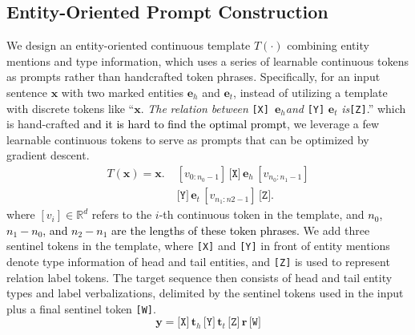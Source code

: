 \documentclass[11pt]{article}
\begin{document}
\subsection{Entity-Oriented Prompt Construction}\label{4.2}
We design an entity-oriented continuous template $T(\cdot)$ combining entity mentions and type information, which uses a series of learnable continuous tokens \cite{DBLP:journals/corr/abs-2103-10385} as prompts rather than handcrafted token phrases. Specifically, for an input sentence $\boldsymbol{x}$ with two marked entities $\boldsymbol{e}_h$ and $\boldsymbol{e}_t$, instead of utilizing a template with discrete tokens like ``$\boldsymbol{x}.$ \textit{The} \textit{relation} \textit{between} \texttt{[X]} \,$\boldsymbol{e}_h$\;\textit{and}\;  \texttt{[Y]}\; $\boldsymbol{e}_t$ \;\textit{is}\;\texttt{[Z]}.'' which is hand-crafted \textcolor{black}{and it is hard to find the optimal prompt}, we leverage a few learnable continuous tokens to serve as prompts that can be optimized by gradient descent.
\begin{equation*}
\begin{aligned}
	T(\boldsymbol{x})=	\boldsymbol{x}. \; &[v_{0:n_0-1}] \,\texttt{[X]} \,\boldsymbol{e}_h\, [v_{n_0:n_1-1}] \\&\texttt{[Y]}\, \boldsymbol{e}_t \,[v_{n_1:n2-1}] \,\texttt{[Z]}.
\end{aligned}
\end{equation*}
where $[v_i]\in\mathbb{R}^d$ refers to the $i$-{th} continuous token in the template, and \textcolor{black}{$n_0$, $n_1-n_0$, and $n_2-n_1$ are the lengths of these token phrases.} We add three sentinel tokens in the template, where \texttt{[X]} and \texttt{[Y]} in front of entity mentions denote type information of head and tail entities, and \texttt{[Z]} is used to represent relation label tokens. The target sequence then consists of head and tail entity types and label verbalizations, delimited by the sentinel tokens used in the input plus a final sentinel token \texttt{[W]}.
\begin{equation*}
\boldsymbol{y} =\texttt{[X]} \,\boldsymbol{t}_h \, \texttt{[Y]}\,\boldsymbol{t}_t \,\texttt{[Z]} \, \boldsymbol{r} \,\texttt{[W]} 
\end{equation*}
\end{document}
